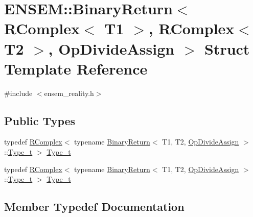 \hypertarget{structENSEM_1_1BinaryReturn_3_01RComplex_3_01T1_01_4_00_01RComplex_3_01T2_01_4_00_01OpDivideAssign_01_4}{}\section{E\+N\+S\+EM\+:\+:Binary\+Return$<$ R\+Complex$<$ T1 $>$, R\+Complex$<$ T2 $>$, Op\+Divide\+Assign $>$ Struct Template Reference}
\label{structENSEM_1_1BinaryReturn_3_01RComplex_3_01T1_01_4_00_01RComplex_3_01T2_01_4_00_01OpDivideAssign_01_4}


{\ttfamily \#include $<$ensem\+\_\+reality.\+h$>$}

\subsection*{Public Types}
\begin{DoxyCompactItemize}
\item 
typedef \mbox{\hyperlink{classENSEM_1_1RComplex}{R\+Complex}}$<$ typename \mbox{\hyperlink{structENSEM_1_1BinaryReturn}{Binary\+Return}}$<$ T1, T2, \mbox{\hyperlink{structENSEM_1_1OpDivideAssign}{Op\+Divide\+Assign}} $>$\+::\mbox{\hyperlink{structENSEM_1_1BinaryReturn_3_01RComplex_3_01T1_01_4_00_01RComplex_3_01T2_01_4_00_01OpDivideAssign_01_4_af46687e10b8bd51c6624cbfdfd75e9ec}{Type\+\_\+t}} $>$ \mbox{\hyperlink{structENSEM_1_1BinaryReturn_3_01RComplex_3_01T1_01_4_00_01RComplex_3_01T2_01_4_00_01OpDivideAssign_01_4_af46687e10b8bd51c6624cbfdfd75e9ec}{Type\+\_\+t}}
\item 
typedef \mbox{\hyperlink{classENSEM_1_1RComplex}{R\+Complex}}$<$ typename \mbox{\hyperlink{structENSEM_1_1BinaryReturn}{Binary\+Return}}$<$ T1, T2, \mbox{\hyperlink{structENSEM_1_1OpDivideAssign}{Op\+Divide\+Assign}} $>$\+::\mbox{\hyperlink{structENSEM_1_1BinaryReturn_3_01RComplex_3_01T1_01_4_00_01RComplex_3_01T2_01_4_00_01OpDivideAssign_01_4_af46687e10b8bd51c6624cbfdfd75e9ec}{Type\+\_\+t}} $>$ \mbox{\hyperlink{structENSEM_1_1BinaryReturn_3_01RComplex_3_01T1_01_4_00_01RComplex_3_01T2_01_4_00_01OpDivideAssign_01_4_af46687e10b8bd51c6624cbfdfd75e9ec}{Type\+\_\+t}}
\end{DoxyCompactItemize}


\subsection{Member Typedef Documentation}
\mbox{\label{structENSEM_1_1BinaryReturn_3_01RComplex_3_01T1_01_4_00_01RComplex_3_01T2_01_4_00_01OpDivideAssign_01_4_af46687e10b8bd51c6624cbfdfd75e9ec}} 
